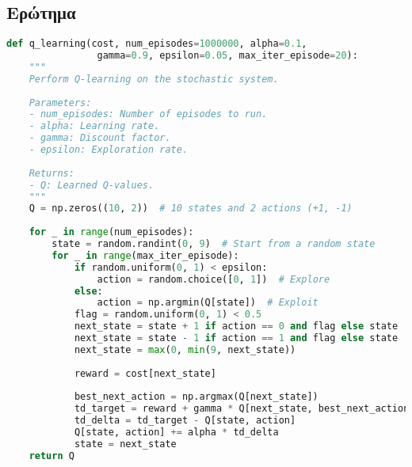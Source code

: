 \documentclass{article}
\begin{document}
\subsection{Ερώτημα}

\begin{lstlisting}[language=Python]
def q_learning(cost, num_episodes=1000000, alpha=0.1,
                gamma=0.9, epsilon=0.05, max_iter_episode=20):
    """
    Perform Q-learning on the stochastic system.
    
    Parameters:
    - num_episodes: Number of episodes to run.
    - alpha: Learning rate.
    - gamma: Discount factor.
    - epsilon: Exploration rate.
    
    Returns:
    - Q: Learned Q-values.
    """
    Q = np.zeros((10, 2))  # 10 states and 2 actions (+1, -1)
    
    for _ in range(num_episodes):
        state = random.randint(0, 9)  # Start from a random state
        for _ in range(max_iter_episode):
            if random.uniform(0, 1) < epsilon:
                action = random.choice([0, 1])  # Explore
            else:
                action = np.argmin(Q[state])  # Exploit
            flag = random.uniform(0, 1) < 0.5
            next_state = state + 1 if action == 0 and flag else state
            next_state = state - 1 if action == 1 and flag else state
            next_state = max(0, min(9, next_state))
            
            reward = cost[next_state]
            
            best_next_action = np.argmax(Q[next_state])
            td_target = reward + gamma * Q[next_state, best_next_action]
            td_delta = td_target - Q[state, action]
            Q[state, action] += alpha * td_delta
            state = next_state
    return Q
\end{lstlisting}
\end{document}
